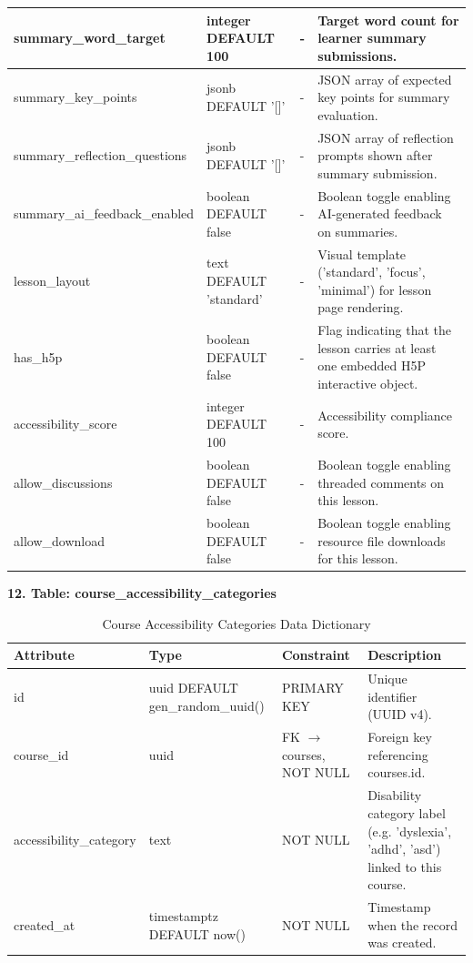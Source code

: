 \documentclass[12pt, oneside]{article} %
\newcommand{\tabbreak}{\hyphenpenalty=200\exhyphenpenalty=200\tolerance=4000\hbadness=10000\hspace{0pt}}
\begin{document}
{\begin{longtable}{|>{\raggedright\arraybackslash\tabbreak}p{2.67cm}|>{\raggedright\arraybackslash\tabbreak}p{2.93cm}|>{\raggedright\arraybackslash\tabbreak}p{2.67cm}|>{\raggedright\arraybackslash\tabbreak}p{4.51cm}|}
summary\_word\_target & integer DEFAULT 100 & - & Target word count for learner summary submissions. \\ \hline
summary\_key\_points & jsonb DEFAULT '[]' & - & JSON array of expected key points for summary evaluation. \\ \hline
summary\_reflection\_questions & jsonb DEFAULT '[]' & - & JSON array of reflection prompts shown after summary submission. \\ \hline
summary\_ai\_feedback\_enabled & boolean DEFAULT false & - & Boolean toggle enabling AI-generated feedback on summaries. \\ \hline
lesson\_layout & text DEFAULT 'standard' & - & Visual template ('standard', 'focus', 'minimal') for lesson page rendering. \\ \hline
has\_h5p & boolean DEFAULT false & - & Flag indicating that the lesson carries at least one embedded H5P interactive object. \\ \hline
accessibility\_score & integer DEFAULT 100 & - & Accessibility compliance score. \\ \hline
allow\_discussions & boolean DEFAULT false & - & Boolean toggle enabling threaded comments on this lesson. \\ \hline
allow\_download & boolean DEFAULT false & - & Boolean toggle enabling resource file downloads for this lesson. \\ \hline
\end{longtable}
}

\textbf{12. Table: course\_accessibility\_categories}

\begin{table}[H]
\caption{Course Accessibility Categories Data Dictionary}
\label{tab:dd_course_accessibility_categories}
\vspace{-4mm}
\begin{center}
\renewcommand{\arraystretch}{1.15}
\scriptsize
\begin{tabular}{|>{\raggedright\arraybackslash\tabbreak}p{2.67cm}|>{\raggedright\arraybackslash\tabbreak}p{2.93cm}|>{\raggedright\arraybackslash\tabbreak}p{2.67cm}|>{\raggedright\arraybackslash\tabbreak}p{4.51cm}|}
\hline
\textbf{Attribute} & \textbf{Type} & \textbf{Constraint} & \textbf{Description} \\ \hline
id & uuid DEFAULT gen\_random\_uuid() & PRIMARY KEY & Unique identifier (UUID v4). \\ \hline
course\_id & uuid & FK $\rightarrow$ courses, NOT NULL & Foreign key referencing courses.id. \\ \hline
accessibility\_category & text & NOT NULL & Disability category label (e.g. 'dyslexia', 'adhd', 'asd') linked to this course. \\ \hline
created\_at & timestamptz DEFAULT now() & NOT NULL & Timestamp when the record was created. \\ \hline
\end{tabular}
\end{center}
\end{table}
\end{document}
